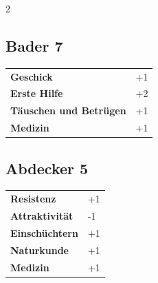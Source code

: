\begin{multicols}{2}
\begin{tcolorbox}

\end{tcolorbox}

\begin{tcolorbox}
    \subsection*{Bader \hfill \small{7 }}
    \tcblower




\begin{tabular}{@{}ll@{}}
    \textbf{Geschick} & +1\\
    \textbf{Erste Hilfe} & +2\\
    \textbf{Täuschen und Betrügen} & +1\\
    \textbf{Medizin} & +1\\
\end{tabular}


\end{tcolorbox}

\begin{tcolorbox}
    \subsection*{Abdecker \hfill \small{5 }}
    \tcblower




\begin{tabular}{@{}ll@{}}
    \textbf{Resistenz} & +1\\
    \textbf{Attraktivität} & -1\\
    \textbf{Einschüchtern} & +1\\
    \textbf{Naturkunde} & +1\\
    \textbf{Medizin} & +1\\
\end{tabular}



\end{tcolorbox}
\end{multicols}
